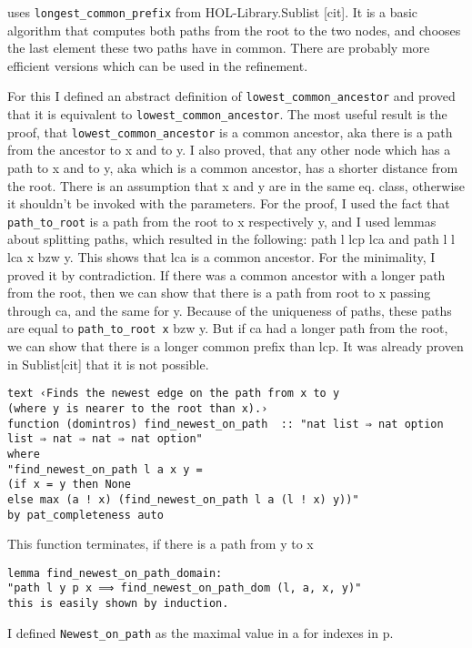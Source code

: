 uses \lstinline{longest_common_prefix} from HOL-Library.Sublist [cit]. It is a basic algorithm that computes both paths from the root to the two nodes, and chooses the last element these two paths have in common. There are probably more efficient versions which can be used in the refinement.

For this I defined an abstract definition of \lstinline{lowest_common_ancestor} and proved that it is equivalent to \lstinline{lowest_common_ancestor}. The most useful result is the proof, that \lstinline{lowest_common_ancestor} is a common ancestor, aka there is a path from the ancestor to x and to y. I also proved, that any other node which has a path to x and to y, aka which is a common ancestor, has a shorter distance from the root. There is an assumption that x and y are in the same eq. class, otherwise it shouldn't be invoked with the parameters.
For the proof, I used the fact that \lstinline{path_to_root} is a path from the root to x respectively y, and I used lemmas about splitting paths, which resulted in the following: path l lcp lca and path l l lca x bzw y. This shows that lca is a common ancestor. For the minimality, I proved it by contradiction. If there was a common ancestor with a longer path from the root, then we can show that there is a path from root to x passing through ca, and the same for y. Because of the uniqueness of paths, these paths are equal to \lstinline{path_to_root x}  bzw y. But if ca had a longer path from the root, we can show that there is a longer common prefix than lcp. It was already proven in Sublist[cit] that it is not possible.

\begin{lstlisting}
text ‹Finds the newest edge on the path from x to y
(where y is nearer to the root than x).›
function (domintros) find_newest_on_path  :: "nat list ⇒ nat option list ⇒ nat ⇒ nat ⇒ nat option"
where
"find_newest_on_path l a x y = 
(if x = y then None
else max (a ! x) (find_newest_on_path l a (l ! x) y))"
by pat_completeness auto
\end{lstlisting}

This function terminates, if there is a path from y to x

\begin{lstlisting}
lemma find_newest_on_path_domain:
"path l y p x ⟹ find_newest_on_path_dom (l, a, x, y)"
this is easily shown by induction.
\end{lstlisting}

I defined \lstinline{Newest_on_path} as the maximal value in a for indexes in p.


